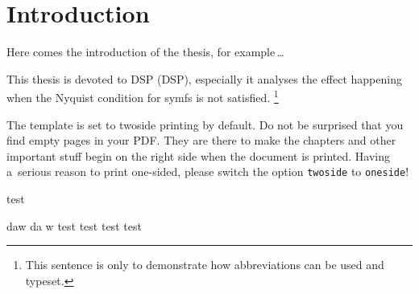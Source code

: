 \chapter*{Introduction}
{}

Here comes the introduction of the thesis, for example\,\dots

This thesis is devoted to \acs{DSP} (\acl{DSP}),
especially it analyses the effect happening when the Nyquist condition for \ac{symfs} is not satisfied.%
\footnote{This sentence is only to demonstrate how abbreviations can be used and typeset.}

The template is set to twoside printing by default.
Do not be surprised that you find empty pages in your PDF.
They are there to make the chapters and other important stuff begin on the right side when the document is printed.
Having a~serious reason to print one-sided, please switch the option \texttt{twoside} to \texttt{oneside}!

test

daw
da
w
test
test
test
test
